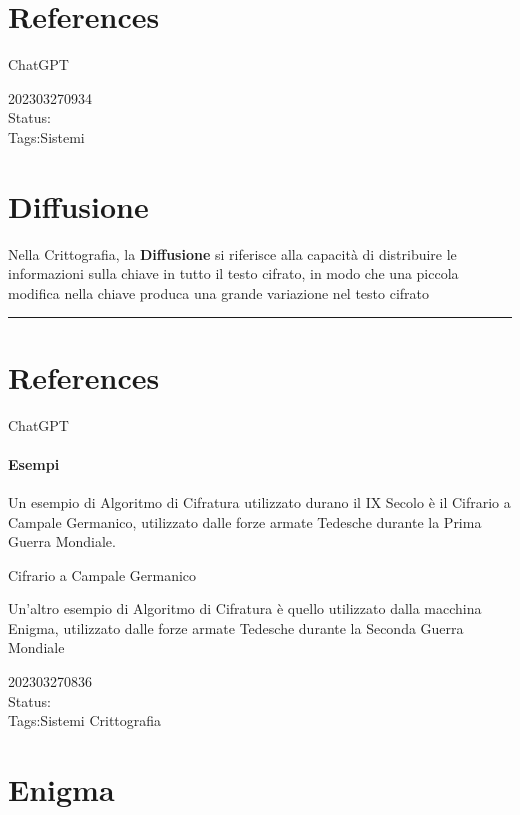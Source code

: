 \documentclass[
]{article}
\begin{document}
\hypertarget{references-10}{%
\section{References}\label{references-10}}

ChatGPT

\hfill\break

202303270934\\
Status:\\
Tags:Sistemi

\hypertarget{diffusione}{%
\section{Diffusione}\label{diffusione}}

Nella Crittografia, la \textbf{Diffusione} si riferisce alla capacità di
distribuire le informazioni sulla chiave in tutto il testo cifrato, in
modo che una piccola modifica nella chiave produca una grande variazione
nel testo cifrato

\begin{center}\rule{0.5\linewidth}{0.5pt}\end{center}

\hypertarget{references-11}{%
\section{References}\label{references-11}}

ChatGPT

\hypertarget{esempi}{%
\paragraph{Esempi}\label{esempi}}

Un esempio di Algoritmo di Cifratura utilizzato durano il IX Secolo è il
Cifrario a Campale Germanico, utilizzato dalle forze armate Tedesche
durante la Prima Guerra Mondiale.

{Cifrario a Campale Germanico}

Un'altro esempio di Algoritmo di Cifratura è quello utilizzato dalla
macchina Enigma, utilizzato dalle forze armate Tedesche durante la
Seconda Guerra Mondiale

202303270836\\
Status:\\
Tags:Sistemi Crittografia

\hypertarget{enigma}{%
\section{Enigma}\label{enigma}}
\end{document}
